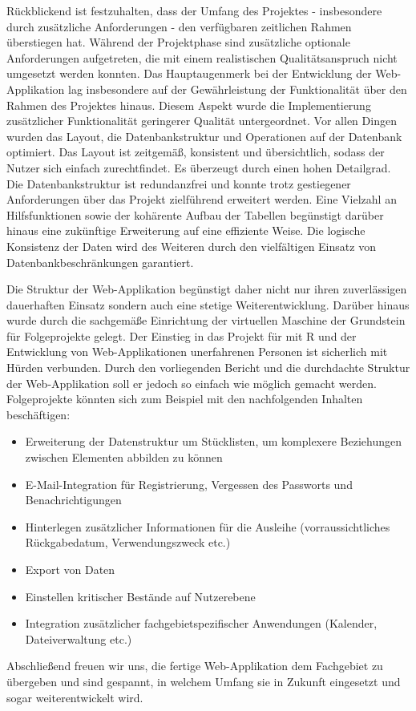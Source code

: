 \documentclass[
]{article}
\providecommand{\tightlist}{%
  \setlength{\itemsep}{0pt}\setlength{\parskip}{0pt}}
\begin{document}
Rückblickend ist festzuhalten, dass der Umfang des Projektes - insbesondere durch zusätzliche Anforderungen - den verfügbaren zeitlichen Rahmen überstiegen hat. Während der Projektphase sind zusätzliche optionale Anforderungen aufgetreten, die mit einem realistischen Qualitätsanspruch nicht umgesetzt werden konnten. Das Hauptaugenmerk bei der Entwicklung der Web-Applikation lag insbesondere auf der Gewährleistung der Funktionalität über den Rahmen des Projektes hinaus. Diesem Aspekt wurde die Implementierung zusätzlicher Funktionalität geringerer Qualität untergeordnet. Vor allen Dingen wurden das Layout, die Datenbankstruktur und Operationen auf der Datenbank optimiert. Das Layout ist zeitgemäß, konsistent und übersichtlich, sodass der Nutzer sich einfach zurechtfindet. Es überzeugt durch einen hohen Detailgrad. Die Datenbankstruktur ist redundanzfrei und konnte trotz gestiegener Anforderungen über das Projekt zielführend erweitert werden. Eine Vielzahl an Hilfsfunktionen sowie der kohärente Aufbau der Tabellen begünstigt darüber hinaus eine zukünftige Erweiterung auf eine effiziente Weise. Die logische Konsistenz der Daten wird des Weiteren durch den vielfältigen Einsatz von Datenbankbeschränkungen garantiert.

Die Struktur der Web-Applikation begünstigt daher nicht nur ihren zuverlässigen dauerhaften Einsatz sondern auch eine stetige Weiterentwicklung. Darüber hinaus wurde durch die sachgemäße Einrichtung der virtuellen Maschine der Grundstein für Folgeprojekte gelegt. Der Einstieg in das Projekt für mit R und der Entwicklung von Web-Applikationen unerfahrenen Personen ist sicherlich mit Hürden verbunden. Durch den vorliegenden Bericht und die durchdachte Struktur der Web-Applikation soll er jedoch so einfach wie möglich gemacht werden. Folgeprojekte könnten sich zum Beispiel mit den nachfolgenden Inhalten beschäftigen:

\begin{itemize}
\tightlist
\item
  Erweiterung der Datenstruktur um Stücklisten, um komplexere Beziehungen zwischen Elementen abbilden zu können
\item
  E-Mail-Integration für Registrierung, Vergessen des Passworts und Benachrichtigungen
\item
  Hinterlegen zusätzlicher Informationen für die Ausleihe (vorraussichtliches Rückgabedatum, Verwendungszweck etc.)
\item
  Export von Daten
\item
  Einstellen kritischer Bestände auf Nutzerebene
\item
  Integration zusätzlicher fachgebietspezifischer Anwendungen (Kalender, Dateiverwaltung etc.)
\end{itemize}

Abschließend freuen wir uns, die fertige Web-Applikation dem Fachgebiet zu übergeben und sind gespannt, in welchem Umfang sie in Zukunft eingesetzt und sogar weiterentwickelt wird.

\clearpage


\null


\printbibliography
\end{document}
